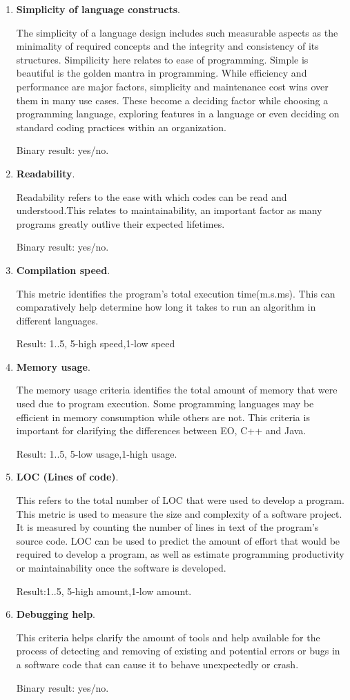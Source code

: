 \documentclass[12pt]{book}
\begin{document}
\begin{enumerate}
    \item \textbf{Simplicity of language constructs}.
    
The simplicity of a language design includes such measurable aspects as the minimality of required concepts and the integrity and consistency of its structures. Simpilicity here relates to ease of programming. Simple is beautiful is the golden mantra in programming. While efficiency and performance are major factors, simplicity and maintenance cost wins over them in many use cases. These become a deciding factor while choosing a programming language, exploring features in a language or even deciding on standard coding practices within an organization.

Binary result: yes/no.
    \item \textbf{Readability}.
    
Readability refers to the ease with which codes can be read and understood.This relates to maintainability, an important factor as many programs greatly outlive their expected lifetimes.

Binary result: yes/no.
    \item \textbf{Compilation speed}.
    
This metric identifies the program's total execution time(m.s.ms). This can comparatively help determine how long it takes to run an algorithm in different languages.

Result: 1..5, 5-high speed,1-low speed
    \item \textbf{Memory usage}.
    
The memory usage criteria identifies the  total amount of memory that were used due to program execution. Some programming languages may be efficient in memory consumption while others are not. This criteria is important for clarifying the differences between EO, C++ and Java.

Result: 1..5, 5-low usage,1-high usage.
    \item \textbf{LOC (Lines of code)}.
    
This refers to the total number of LOC that were used to develop a program. This metric is used to measure the size and complexity of a software project. It is measured by counting the number of lines in text of the program's source code. LOC can be used to predict the amount of effort that would be required to develop a program, as well as estimate programming productivity or maintainability once the software is developed.

Result:1..5, 5-high amount,1-low amount.
    \item \textbf{Debugging help}.
    
This criteria helps clarify the amount of tools and help available for the process of detecting and removing of existing and potential errors or bugs in a software code that can cause it to behave unexpectedly or crash.

Binary result: yes/no.
\end{enumerate}
\end{document}
